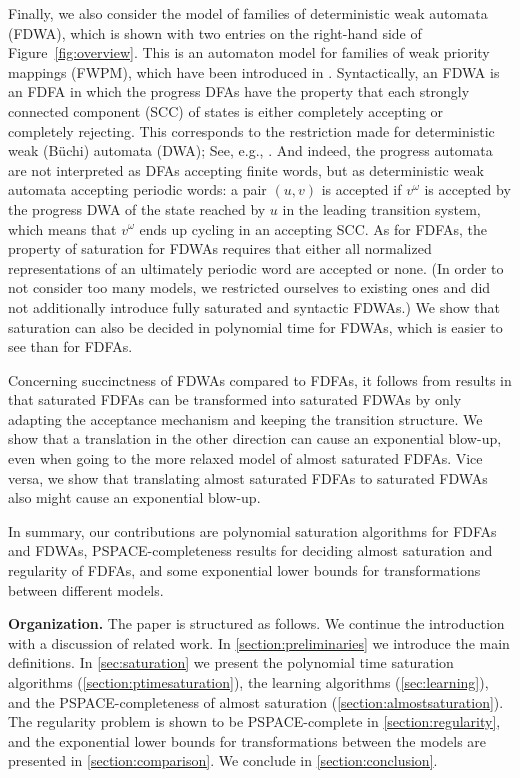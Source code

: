 \documentclass[a4paper,USenglish,cleveref,autoref,thm-restate]{lipics-v2021}
\newcommand{\PSPACE}{\textsf{PSPACE}\xspace}
\begin{document}
Finally, we also consider the model of families of deterministic weak automata (FDWA), which is shown with two entries on the right-hand side of Figure~\ref{fig:overview}. This is an automaton model for families of weak priority mappings (FWPM), which have been introduced in \cite{BohnL24}. Syntactically, an FDWA is an FDFA in which the progress DFAs have the property that each strongly connected component (SCC) of states is either completely accepting or completely rejecting. This corresponds to the restriction made for deterministic weak (B\"uchi) automata (DWA); See, e.g., \cite{Loding01}. And indeed, the progress automata are not interpreted as DFAs accepting finite words, but as deterministic weak automata accepting periodic words: a pair $(u,v)$ is accepted if $v^\omega$ is accepted by the progress DWA of the state reached by $u$ in the leading transition system, which means that $v^\omega$ ends up cycling in an accepting SCC. 
As for FDFAs, the property of saturation for FDWAs requires that either all normalized representations of an ultimately periodic word are accepted or none. (In order to not consider too many models, we restricted ourselves to existing ones and did not additionally introduce fully saturated and syntactic FDWAs.)
We show that saturation can also be decided in polynomial time for FDWAs, which is easier to see than for FDFAs.

Concerning succinctness of FDWAs compared to FDFAs, it follows from results in \cite{BohnL24} that saturated FDFAs can be transformed into saturated FDWAs by only adapting the acceptance mechanism and keeping the transition structure. We show that a translation in the other direction can cause an exponential blow-up, even when going to the more relaxed model of almost saturated FDFAs. Vice versa, we show that translating almost saturated FDFAs to saturated FDWAs also might cause an exponential blow-up.



In summary, our contributions are polynomial saturation algorithms for FDFAs and FDWAs, \PSPACE-completeness results for deciding almost saturation and regularity of FDFAs, and some exponential lower bounds for
transformations between different models.

\smallskip 
\noindent\textbf{Organization.} The paper is structured as follows. We continue the introduction with a discussion of related work. In \cref{section:preliminaries} we introduce the main definitions. In \cref{sec:saturation} we present the polynomial time saturation algorithms (\cref{section:ptimesaturation}), the learning algorithms (\cref{sec:learning}), and the \PSPACE-completeness of almost saturation (\cref{section:almostsaturation}). The regularity problem is shown to be \PSPACE-complete in \cref{section:regularity}, and the exponential lower bounds for transformations between the models are presented in \cref{section:comparison}. We conclude in \cref{section:conclusion}.
\end{document}
